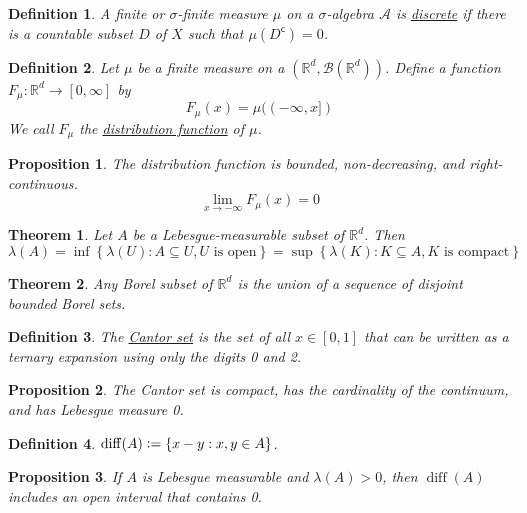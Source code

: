 \documentclass[12pt]{article}
\newtheorem{definition}{Definition}[subsection]
\newtheorem{proposition}{Proposition}[subsection]
\newtheorem{theorem}{Theorem}[subsection]
\begin{document}
\begin{definition}
	A finite or $\sigma$-finite measure $\mu$ on a $\sigma$-algebra $\mathcal{A}$ is \underline{discrete} if there is a countable subset $D$ of $X$ such that $\mu(D^\mathsf{c}) = 0$.
\end{definition}

\begin{definition}
	Let $\mu$ be a finite measure on a $(\mathbb{R}^d, \mathcal{B}(\mathbb{R}^d))$. Define a function $F_\mu: \mathbb{R}^d \to [0, \infty]$ by
	$$F_\mu(x) = \mu((-\infty, x])$$
	We call $F_\mu$ the \underline{distribution function} of $\mu$.
\end{definition}
\begin{proposition}
	The distribution function is bounded, non-decreasing, and right-continuous.
	$$ \lim_{x \to -\infty} F_\mu(x) = 0$$
\end{proposition}

\begin{theorem}
	Let $A$ be a Lebesgue-measurable subset of $\mathbb{R}^d$. Then
	$$\lambda(A) = \inf\left\{\lambda(U): A \subseteq U, U \text{ is open}\right\}= \sup\left\{\lambda(K): K \subseteq A, K \text{ is compact}\right\}$$
\end{theorem}

\begin{theorem}
	Any Borel subset of $\mathbb{R}^d$ is the union of a sequence of disjoint bounded Borel sets.
\end{theorem}

\begin{definition}
	The \underline{Cantor set} is the set of all $x \in [0, 1]$ that can be written as a ternary expansion using only the digits 0 and 2.
\end{definition}
\begin{proposition}
	The Cantor set is compact, has the cardinality of the continuum, and has Lebesgue measure 0.
\end{proposition}
\begin{definition}
	$\operatorname{diff}(A)\vcentcolon= \{x - y: x, y \in A\}$.
\end{definition}
\begin{proposition}
	If $A$ is Lebesgue measurable and $\lambda (A)>0$, then $\operatorname{diff}(A)$ includes an open interval that contains 0.
\end{proposition}
\end{document}
